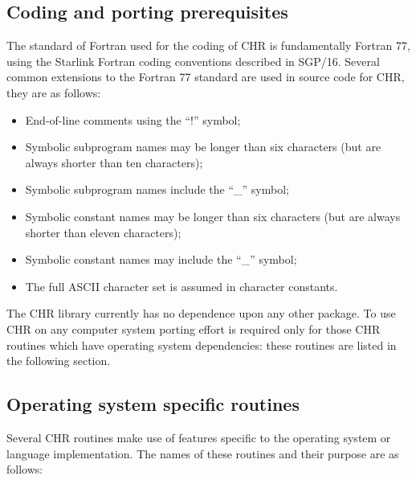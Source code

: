 \documentclass[twoside,11pt,nolof]{starlink}
\begin{document}
\subsection {Coding and porting prerequisites}

The standard of Fortran used for the coding of CHR is fundamentally
Fortran 77, using the Starlink Fortran coding conventions described in SGP/16.
Several common extensions to the Fortran 77 standard are used in source
code for CHR, they are as follows:

\begin {itemize}
\item End-of-line comments using the ``!'' symbol;
\item Symbolic subprogram names may be longer than six characters (but are
always shorter than ten characters);
\item Symbolic subprogram names include the ``\_'' symbol;
\item Symbolic constant names may be longer than six characters (but are always
shorter than eleven characters);
\item Symbolic constant names may include the ``\_'' symbol;
\item The full ASCII character set is assumed in character constants.
\end {itemize}

The CHR library currently has no dependence upon any other package.
To use CHR on any computer system porting effort is required only for those
CHR routines which have operating system dependencies: these routines are
listed in the following section.


\subsection {Operating system specific routines}

Several CHR routines make use of features specific to the operating system or
language implementation.
The names of these routines and their purpose are as follows:
\end{document}
